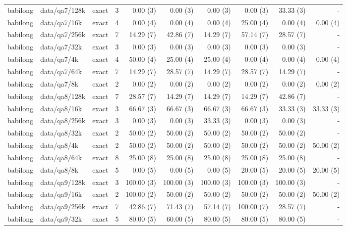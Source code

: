 \begin{landscape}
\begin{longtable}{@{}p{19mm}p{52mm}p{25mm}rrrrrrr@{}}
babilong & data/qa7/128k & exact & 3 & 0.00 (3) & 0.00 (3) & 0.00 (3) & 0.00 (3) & 33.33 (3) & - \\
babilong & data/qa7/16k & exact & 4 & 0.00 (4) & 0.00 (4) & 0.00 (4) & 25.00 (4) & 0.00 (4) & 0.00 (4) \\
babilong & data/qa7/256k & exact & 7 & 14.29 (7) & 42.86 (7) & 14.29 (7) & 57.14 (7) & 28.57 (7) & - \\
babilong & data/qa7/32k & exact & 3 & 0.00 (3) & 0.00 (3) & 0.00 (3) & 0.00 (3) & 0.00 (3) & - \\
babilong & data/qa7/4k & exact & 4 & 50.00 (4) & 25.00 (4) & 25.00 (4) & 0.00 (4) & 0.00 (4) & 0.00 (4) \\
babilong & data/qa7/64k & exact & 7 & 14.29 (7) & 28.57 (7) & 14.29 (7) & 28.57 (7) & 14.29 (7) & - \\
babilong & data/qa7/8k & exact & 2 & 0.00 (2) & 0.00 (2) & 0.00 (2) & 0.00 (2) & 0.00 (2) & 0.00 (2) \\
babilong & data/qa8/128k & exact & 7 & 28.57 (7) & 14.29 (7) & 14.29 (7) & 14.29 (7) & 42.86 (7) & - \\
babilong & data/qa8/16k & exact & 3 & 66.67 (3) & 66.67 (3) & 66.67 (3) & 66.67 (3) & 33.33 (3) & 33.33 (3) \\
babilong & data/qa8/256k & exact & 3 & 0.00 (3) & 0.00 (3) & 33.33 (3) & 0.00 (3) & 0.00 (3) & - \\
babilong & data/qa8/32k & exact & 2 & 50.00 (2) & 50.00 (2) & 50.00 (2) & 50.00 (2) & 50.00 (2) & - \\
babilong & data/qa8/4k & exact & 2 & 50.00 (2) & 50.00 (2) & 50.00 (2) & 50.00 (2) & 50.00 (2) & 50.00 (2) \\
babilong & data/qa8/64k & exact & 8 & 25.00 (8) & 25.00 (8) & 25.00 (8) & 25.00 (8) & 25.00 (8) & - \\
babilong & data/qa8/8k & exact & 5 & 0.00 (5) & 0.00 (5) & 0.00 (5) & 20.00 (5) & 20.00 (5) & 20.00 (5) \\
babilong & data/qa9/128k & exact & 3 & 100.00 (3) & 100.00 (3) & 100.00 (3) & 100.00 (3) & 100.00 (3) & - \\
babilong & data/qa9/16k & exact & 2 & 100.00 (2) & 50.00 (2) & 50.00 (2) & 50.00 (2) & 50.00 (2) & 50.00 (2) \\
babilong & data/qa9/256k & exact & 7 & 42.86 (7) & 71.43 (7) & 57.14 (7) & 100.00 (7) & 28.57 (7) & - \\
babilong & data/qa9/32k & exact & 5 & 80.00 (5) & 60.00 (5) & 80.00 (5) & 80.00 (5) & 80.00 (5) & - \\

\end{longtable}
\end{landscape}
